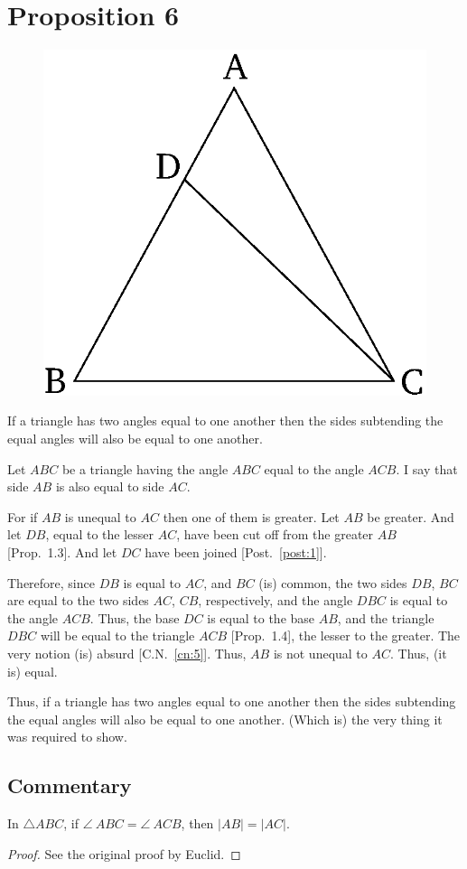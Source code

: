 \chapter*{Proposition 6}
\label{prop:6}

\begin{figure}[ht]
    \begin{center}
    \includegraphics[width=0.5\linewidth]{figures/fig06e.eps}
    \label{fig:prop_6}
    \end{center}
\end{figure}

If a triangle has two angles equal to one another then the sides subtending the
equal angles will also be equal to one another.

Let $ABC$ be a triangle having the angle $ABC$ equal to the angle $ACB$. I say that
side $AB$ is also equal to side $AC$.

For if $AB$ is unequal to $AC$ then one of them is greater. Let $AB$ be greater. And
let $DB$, equal to the lesser $AC$, have been cut off from the greater $AB$ [Prop.~1.3].  And
let $DC$ have been joined [Post.~\ref{post:1}].

Therefore, since $DB$ is equal to $AC$, and $BC$ (is) common, the two sides $DB$, $BC$ are equal to the two sides $AC$, $CB$, respectively, and the angle $DBC$
is equal to the angle $ACB$. Thus, the base $DC$ is equal to the base
$AB$, and the triangle $DBC$ will be equal to the triangle $ACB$ [Prop.~1.4], the lesser
to the greater. The very notion (is) absurd [C.N.~\ref{cn:5}]. Thus, $AB$ is not unequal
to $AC$. Thus, (it is) equal.

Thus, if a triangle has two angles equal to one another then the sides subtending the
equal angles will also be equal to one another. (Which is) the very thing it was required to show.


\section*{Commentary}

\begin{proposition}\label{proposition_6}\leanok
    In $\triangle ABC$, if $\angle~ABC = \angle~ACB$, then $|AB| = |AC|$.
\end{proposition}
\begin{proof}
    \leanok
    See the original proof by Euclid.
\end{proof}
